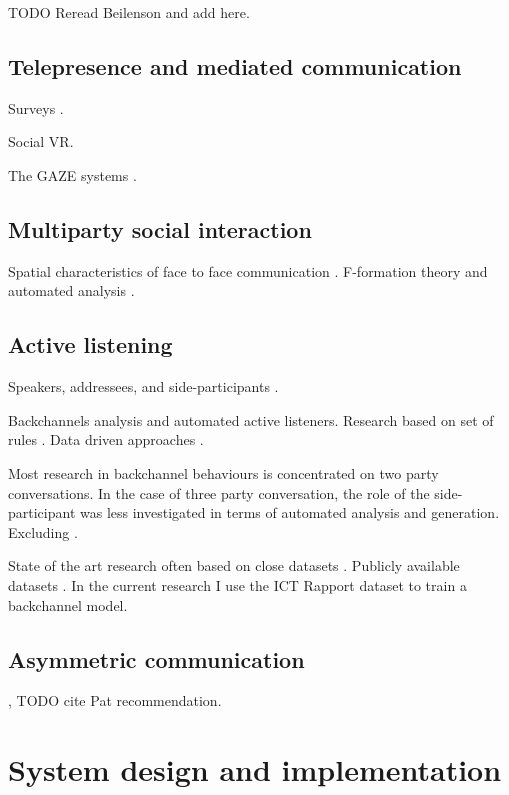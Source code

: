 \documentclass[]{simple-thesis}
\begin{document}
TODO Reread Beilenson and add here.

\section{Telepresence and mediated communication}

Surveys \citep{Isaacs1994, Erickson2000}.

Social VR.

The GAZE systems \citep{Vertegaal1999, Vertegaal2003}.

\section{Multiparty social interaction}

Spatial characteristics of face to face communication \citep{Schegloff1998}.
F-formation theory \citep{Kendon1990} and automated analysis \citep{Setti2015}.

\section{Active listening}

Speakers, addressees, and side-participants \citep{Clark1982}.

Backchannels analysis and automated active listeners.
Research based on set of rules \citep{Ward2000, Nishimura2007, Gratch2007}.
Data driven approaches \citep{Morency2008, Huang2011, Kok2012}.

Most research in backchannel behaviours is concentrated on two party conversations.
In the case of three party conversation, the role of the side-participant was less investigated in terms of automated analysis and generation.
Excluding \citep{Matsusaka2003, Fujie2009}.

State of the art research often based on close datasets \citep{Kok2011}.
Publicly available datasets \citep{Aubrey2013, Oertel2013}.
In the current research I use the ICT Rapport dataset \citep{Gratch2007} to train a backchannel model.

\section{Asymmetric communication}

\citep{Chou2016}, TODO cite Pat recommendation.


\chapter{System design and implementation}\label{system_design_and_implementation}
\end{document}
